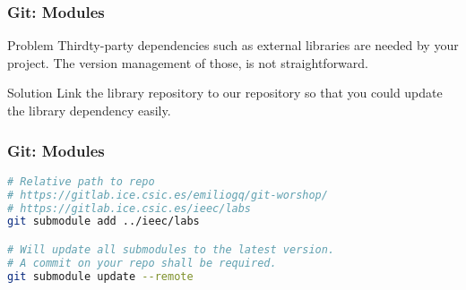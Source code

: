 \begin{frame}

\frametitle{Git: Modules}

\begin{block}{Problem}
Thirdty-party dependencies such as external libraries are needed by your project. The version management of those, is not straightforward.
\end{block}

\pause

\begin{block}{Solution}
Link the library repository to our repository so that you could update the library dependency easily.
\end{block}

\end{frame}

\begin{frame}[fragile]

\frametitle{Git: Modules}

\begin{lstlisting}[language=Bash]
# Relative path to repo
# https://gitlab.ice.csic.es/emiliogq/git-worshop/
# https://gitlab.ice.csic.es/ieec/labs
git submodule add ../ieec/labs

# Will update all submodules to the latest version. 
# A commit on your repo shall be required.
git submodule update --remote
\end{lstlisting}


\end{frame}
